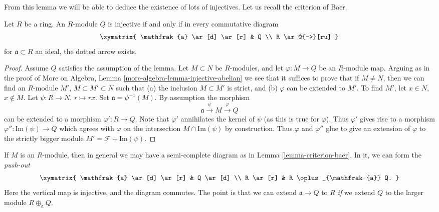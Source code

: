\noindent
From this lemma we will be able to deduce the existence of lots of injectives.
Let us recall the criterion of Baer.

\begin{lemma}
\label{lemma-criterion-baer}
Let $R$ be a ring. An $R$-module $Q$ is injective if and only if in every
commutative diagram
$$
\xymatrix{
\mathfrak{a} \ar[d] \ar[r] &  Q \\
R \ar@{-->}[ru]
}
$$
for $\mathfrak{a} \subset R$ an ideal, the dotted arrow exists.
\end{lemma}

\begin{proof}
Assume $Q$ satisfies the assumption of the lemma.
Let $M \subset N$ be $R$-modules, and let $\varphi : M \to Q$ be an
$R$-module map. Arguing as in the proof of
More on Algebra, Lemma \ref{more-algebra-lemma-injective-abelian}
we see that it suffices to prove that if $M \not = N$, then we
can find an $R$-module $M'$, $M \subset M' \subset N$
such that (a) the inclusion $M \subset M'$ is strict,
and (b) $\varphi$ can be extended to $M'$.
To find $M'$, let $x \in N$, $x \not \in M$. Let $\psi : R \to N$,
$r \mapsto rx$. Set $\mathfrak{a} = \psi^{-1}(M)$. By assumption the
morphism
$$
\mathfrak a \xrightarrow{\psi} M \xrightarrow{\varphi} Q
$$
can be extended to a morphism $\varphi' : R \to Q$.
Note that $\varphi'$ annihilates the kernel of $\psi$ (as this is true
for $\varphi$). Thus $\varphi'$ gives rise to a morphism
$\varphi'' : \text{Im}(\psi) \to Q$ which agrees with $\varphi$
on the intersection $M \cap \text{Im}(\psi)$ by construction.
Thus $\varphi$ and $\varphi''$ glue to give an extension
of $\varphi$ to the strictly bigger module
$M' = \mathcal{F} + \text{Im}(\psi)$.
\end{proof}

\noindent
If $M$ is an $R$-module, then in general we may have a semi-complete
diagram as in
Lemma \ref{lemma-criterion-baer}.
In it, we can form the \emph{push-out}
$$
\xymatrix{
\mathfrak{a} \ar[d]  \ar[r] &  Q \ar[d] \\
R \ar[r] &  R \oplus_{\mathfrak{a}} Q.
}
$$
Here the vertical map is injective, and the diagram commutes. The point is
that we can extend $\mathfrak{a} \to Q$ to $R$ \emph{if} we extend $Q$ to the
larger module $R \oplus_{\mathfrak{a}} Q$.

